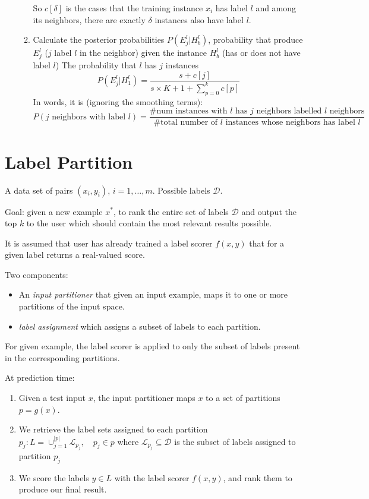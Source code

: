 \begin{enumerate}
\begin{enumerate}
                So $c[\delta]$ is the cases that the training instance
                $x_i$ has label $l$ and among its neighbors, there are exactly
                $\delta$ instances also have label $l$.
            \item Calculate the posterior probabilities $P(E_j^l|H_b^l)$,
                probability that produce $E_j^l$ ($j$ label $l$ in
                the neighbor) given the instance $H_b^l$ (has or does not
                have label $l$)
                The probability that $l$ has $j$ instances
                \[
                    P(E_j^l|H_1^l) = \frac{s + c[j]}{s\times{K+1} +
                    \sum_{p=0}^k c[p]}
                \]
                In words, it is (ignoring the smoothing terms):
                \[ P(\mbox{$j$ neighbors with
                label $l$}) = \frac{\#\mbox{num instances with $l$ has
                $j$ neighbors labelled $l$ neighbors}}{\#\mbox{total
                    number of $l$ instances whose
                neighbors has label $l$}}
            \]
        \end{enumerate}
\end{enumerate}

\section{Label Partition}
A data set of pairs $(x_i, y_i)$, $i = 1, \dots, m$. Possible labels
$\mathcal{D}$.

Goal: given a new example $x^*$, to rank the entire set of labels
$\mathcal{D}$ and output the top $k$ to the user which should contain the
most relevant results possible.

It is assumed that user has already trained a label scorer $f(x,y)$ that
for a given label returns a real-valued score.

Two components:
\begin{itemize}
    \item An \emph{input partitioner} that given an input example, maps it
        to one or more partitions of the input space.
    \item \emph{label assignment} which assigns a subset of labels to each
        partition.
\end{itemize}

For given example, the label scorer is applied to only the subset of
labels present in the corresponding partitions.

At prediction time:

\begin{enumerate}
    \item Given a test input $x$, the input partitioner maps $x$ to a set
        of partitions $p = g(x)$.
    \item We retrieve the label sets assigned to each partition $p_j: L =
        \cup_{j=1}^{|p|} \mathcal{L}_{p_j}, \quad p_j \in p$ where $\mathcal{L}_{p_j}
        \subseteq \mathcal{D}$ is the subset of labels assigned to
        partition $p_j$
    \item We score the labels $y \in L$ with the label scorer $f(x,y)$,
        and rank them to produce our final result.
\end{enumerate}

